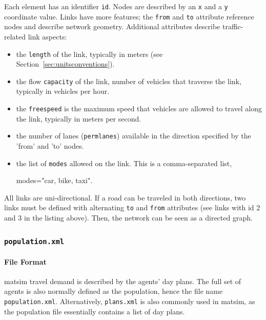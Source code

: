 Each element has an identifier \lstinline|id|. Nodes are described by an \lstinline|x| and a \lstinline|y| coordinate value. Links have more features; the \lstinline|from| and \lstinline|to| attribute reference nodes and describe network geometry. Additional attributes describe traffic-related link aspects:
\begin{itemize}\styleItemize
    \item the \lstinline|length| of the link, typically in meters (see Section~\ref{sec:unitsconventions}).
    \item the flow \lstinline|capacity| of the link, \ie number of vehicles that traverse the link, typically in vehicles per hour.
    \item the \lstinline|freespeed| is the maximum speed that vehicles are allowed to travel along the link, typically in meters per second.
    \item the number of lanes (\lstinline|permlanes|) available in the direction specified by the 'from' and 'to' nodes.
    \item the list of \lstinline|modes| allowed on the link. This is a comma-separated list, \eg 
		\begin{xml}
			modes="car, bike, taxi".
		\end{xml}
\end{itemize}
All links are uni-directional. If a road can be traveled in both directions, two links must be defined with alternating \lstinline|to| and \lstinline|from| attributes (see links with id 2 and 3 in the listing above). Then, the network can be seen as a directed graph. 

\subsubsection{\lstinline|population.xml|}
\label{sec:lgstarted-population-file}
\paragraph{File Format}

 \gls{matsim} travel demand is described by the agents' day plans. The full set of agents is also normally defined as the population, hence the file name \lstinline|population.xml|. Alternatively, \lstinline|plans.xml| is also commonly used in \gls{matsim}, as the population file essentially contains a list of day plans.

